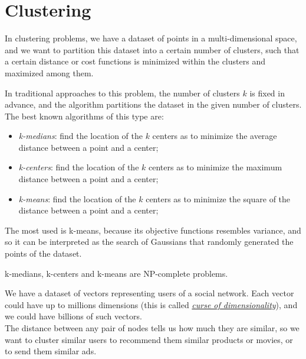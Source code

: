 \chapter{Clustering}\label{sec:clustering}

In clustering problems, we have a dataset of points in a multi-dimensional space, and we want to partition this dataset into a certain number of clusters, such that a certain distance or cost functions is minimized within the clusters and maximized among them.

In traditional approaches to this problem, the number of clusters $k$ is fixed in advance, and the algorithm partitions the dataset in the given number of clusters.\\
The best known algorithms of this type are:\label{clust-k-algs}
\begin{itemize}
    \item \textit{k-medians}: find the location of the $k$ centers as to minimize the average distance between a point and a center;
    \item \textit{k-centers}: find the location of the $k$ centers as to minimize the maximum distance between a point and a center;
    \item \textit{k-means}: find the location of the $k$ centers as to minimize the square of the distance between a point and a center;
\end{itemize}

\obs The most used is k-means, because its objective functions resembles variance, and so it can be interpreted as the search of Gaussians that randomly generated the points of the dataset.

\begin{thm}\label{thm:clustering-np}
    k-medians, k-centers and k-means are NP-complete problems.
\end{thm}

\begin{ex}
    We have a dataset of vectors representing users of a social network. Each vector could have up to millions dimensions (this is called \href{https://en.wikipedia.org/wiki/Curse_of_dimensionality}{\textit{curse of dimensionality}}), and we could have billions of such vectors.\\
    The distance between any pair of nodes tells us how much they are similar, so we want to cluster similar users to recommend them similar products or movies, or to send them similar ads.
\end{ex}

